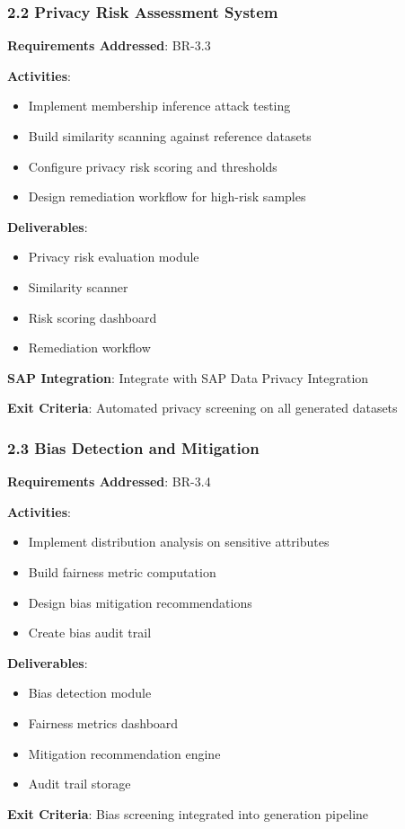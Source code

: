 \subsubsection{2.2 Privacy Risk Assessment System}

\begin{tcolorbox}[colback=green!5,colframe=green!70,title=2.2 Privacy Controls]
\textbf{Requirements Addressed}: BR-3.3

\textbf{Activities}:
\begin{itemize}
  \item Implement membership inference attack testing
  \item Build similarity scanning against reference datasets
  \item Configure privacy risk scoring and thresholds
  \item Design remediation workflow for high-risk samples
\end{itemize}

\textbf{Deliverables}:
\begin{itemize}
  \item Privacy risk evaluation module
  \item Similarity scanner
  \item Risk scoring dashboard
  \item Remediation workflow
\end{itemize}

\textbf{SAP Integration}: Integrate with SAP Data Privacy Integration

\textbf{Exit Criteria}: Automated privacy screening on all generated datasets
\end{tcolorbox}

\subsubsection{2.3 Bias Detection and Mitigation}

\begin{tcolorbox}[colback=green!5,colframe=green!70,title=2.3 Bias Controls]
\textbf{Requirements Addressed}: BR-3.4

\textbf{Activities}:
\begin{itemize}
  \item Implement distribution analysis on sensitive attributes
  \item Build fairness metric computation
  \item Design bias mitigation recommendations
  \item Create bias audit trail
\end{itemize}

\textbf{Deliverables}:
\begin{itemize}
  \item Bias detection module
  \item Fairness metrics dashboard
  \item Mitigation recommendation engine
  \item Audit trail storage
\end{itemize}

\textbf{Exit Criteria}: Bias screening integrated into generation pipeline
\end{tcolorbox}

